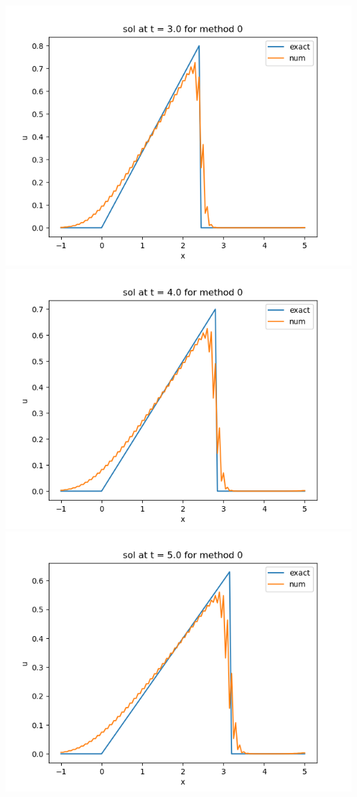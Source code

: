 \documentclass{article}
\begin{document}
\begin{center}
	\includegraphics[scale=.23]{hw13 sol t = 3 method 0}
	\includegraphics[scale=.3]{hw13 sol t = 4 method 0}
	\includegraphics[scale=.3]{hw13 sol t = 5 method 0}

\end{center}
\end{document}
